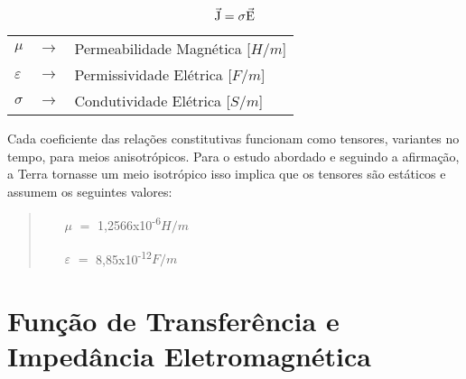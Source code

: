         \begin{equation}
         \vec{\textrm{J}} = \sigma \vec{\textrm{E}}
        \end{equation}

        {\footnotesize \noindent
            \begin{table}[H]
                \begin{tabular*}{1cm}{p{0.05cm}p{0.1cm}p{10cm}}
                    {\footnotesize $\mu$}          & {\footnotesize $\rightarrow$} & {\footnotesize Permeabilidade Magnética [$H/m$] }\\
                    {\footnotesize $\varepsilon$}  & {\footnotesize $\rightarrow$} & {\footnotesize Permissividade Elétrica [$F/m$] }\\
                    {\footnotesize $\sigma$}       & {\footnotesize $\rightarrow$} & {\footnotesize Condutividade Elétrica [$S/m$]} \\
                \end{tabular*}
            \end{table}}

        Cada coeficiente das relações constitutivas funcionam como tensores, variantes no tempo, para meios anisotrópicos. Para o estudo abordado e seguindo a afirmação, a Terra tornasse um meio isotrópico isso implica que os tensores são estáticos e assumem os seguintes valores:
        
        \begin{quote}
         \begin{enumerate}
          \item[$\mu$] $=$ 1,2566x10\textsuperscript{-6}$H/m$
          \item[$\varepsilon$] $=$ 8,85x10\textsuperscript{-12}$F/m$
         \end{enumerate}
        \end{quote}
        
    
    \section{Função de Transferência e Impedância Eletromagnética}
        
